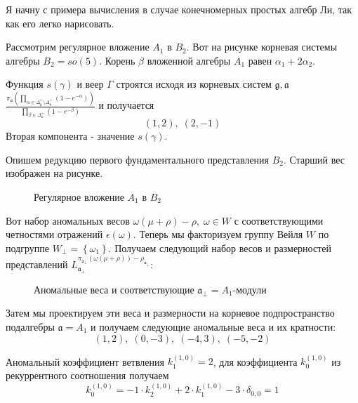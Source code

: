 Я начну с примера вычисления в случае конечномерных простых алгебр Ли, так как его легко нарисовать.

Рассмотрим регулярное вложение  $A_1$ в $B_2$. Вот на рисунке корневая системы алгебры $B_2=so(5)$.
Корень  $\beta$ вложенной алгебры $A_1$ равен $\alpha_1+2\alpha_2$.

Функция $s(\gamma)$ и веер $\Gamma$ строятся исходя из корневых систем $\mathfrak{g}, \mathfrak{a}$
$\frac{\pi_{\mathfrak{a}}\left(\prod_{\alpha\in \Delta^{+}_{\mathfrak{g}}\setminus
      \Delta^{+}_{\mathfrak{a}}} \left(1-e^{-\alpha}\right) \right)}{\prod_{\beta\in
    \Delta^{+}_{\mathfrak{a}}} \left(1-e^{-\beta}\right) }$ и получается
\begin{equation}
  \label{eq:22}
  (1,2),\; (2,-1)
\end{equation}
Вторая компонента - значение $s(\gamma)$.

Опишем редукцию первого фундаментального представления $B_2$. Старший вес изображен на рисунке.
\begin{figure}[ph]
  \noindent\centering{
    \texttt{[image: B2\_A1]}
  }
  \caption{Регулярное вложение $A_1$ в $B_2$}
  \label{fig:B2_A1}
\end{figure}
Вот набор аномальных весов $\omega(\mu+\rho)-\rho,\; \omega\in W$ с соответствующими четностями
отражений $\epsilon(\omega)$.
Теперь мы факторизуем группу Вейля $W$ по подгруппе $W_{\bot}=\left\{\omega_1\right\}$. Получаем
следующий набор весов и размерностей представлений  $L^{\pi_{\mathfrak{a}_{\bot}}(\omega(\mu+\rho))-\rho_{\mathfrak{a}_{\bot}}}_{\mathfrak{a}_{\bot}}$:
\begin{figure}[h!tb]
  \noindent\centering{
    \texttt{[image: B2\_A1\_2]}
  }
  \caption{Аномальные веса и соответствующие $\mathfrak{a}_{\bot}=A_1$-модули}
  \label{fig:B2_A1_2}
\end{figure}

Затем мы проектируем эти веса и размерности на корневое подпространство подалгебры
$\mathfrak{a}=A_1$ и получаем следующие аномальные веса и их кратности:
\begin{equation}
  \label{eq:25}
  (1,2),\; (0,-3),\; (-4,3),\; (-5,-2)
\end{equation}

Аномальный коэффициент ветвления  $k^{(1,0)}_{1}=2$, для коэффициента $k^{(1,0)}_{0}$ из
рекуррентного соотношения получаем
\begin{equation}
  \label{eq:23}
  k^{(1,0)}_{0}=-1\cdot k^{(1,0)}_2 +2\cdot k^{(1,0)}_1 - 3\cdot \delta_{0,0} = 1
\end{equation}

